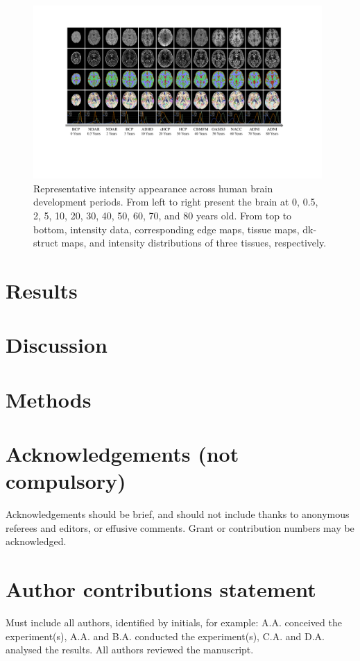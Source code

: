 \documentclass[fleqn,10pt]{wlscirep}
\begin{document}
\begin{figure}[t]
    \begin{center}
    \includegraphics[width=0.98\textwidth]{./figure/data_sample_v1.pdf}
    \caption{Representative intensity appearance across human brain development periods. From left to right present the brain at 0, 0.5, 2, 5, 10, 20, 30, 40, 50, 60, 70, and 80 years old. From top to bottom, intensity data, corresponding edge maps, tissue maps, dk-struct maps, and intensity distributions of three tissues, respectively.} \label{fig:data_sample_v1}
    \end{center}
\end{figure}

\section*{Results}


\section*{Discussion}



\section*{Methods}







\section*{Acknowledgements (not compulsory)}

Acknowledgements should be brief, and should not include thanks to anonymous referees and editors, or effusive comments. Grant or contribution numbers may be acknowledged.

\section*{Author contributions statement}

Must include all authors, identified by initials, for example:
A.A. conceived the experiment(s),  A.A. and B.A. conducted the experiment(s), C.A. and D.A. analysed the results.  All authors reviewed the manuscript. 
\end{document}
